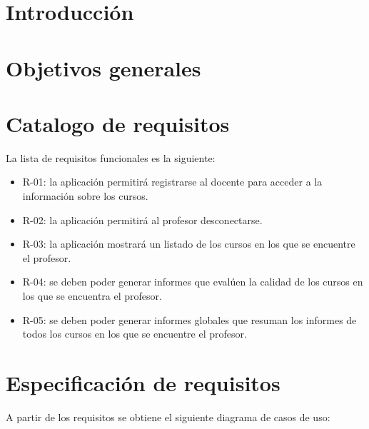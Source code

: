 
\section{Introducción}

\section{Objetivos generales}

\section{Catalogo de requisitos}
La lista de requisitos funcionales es la siguiente:
\begin{itemize}
	\item R-01: la aplicación permitirá registrarse al docente para acceder a la información sobre los cursos.
	\item R-02: la aplicación permitirá al profesor desconectarse.
	\item R-03: la aplicación mostrará un listado de los cursos en los que se encuentre el profesor.
	\item R-04: se deben poder generar informes que evalúen la calidad de los cursos en los que se encuentra el profesor.
	\item R-05: se deben poder generar informes globales que resuman los informes de todos los cursos en los que se encuentre el profesor.
\end{itemize}

\section{Especificación de requisitos}
A partir de los requisitos se obtiene el siguiente diagrama de casos de uso:


